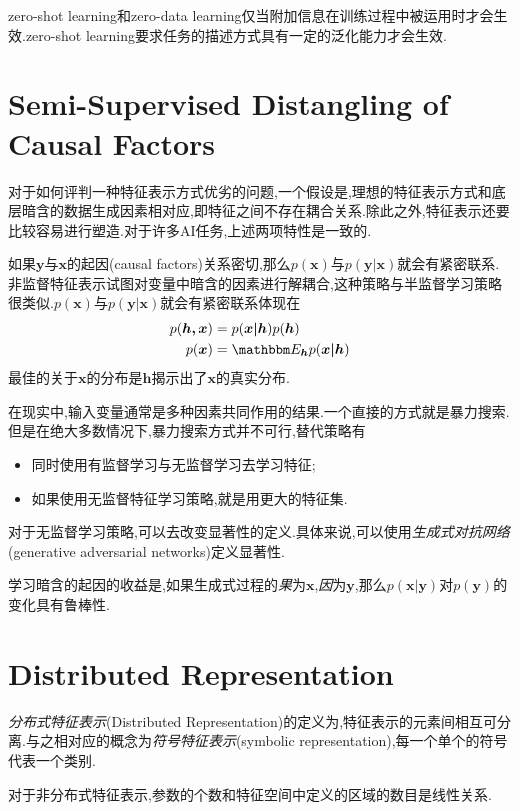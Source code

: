 zero-shot learning和zero-data learning仅当附加信息在训练过程中被运用时才会生效.zero-shot learning要求任务的描述方式具有一定的泛化能力才会生效.

\section{Semi-Supervised Distangling of Causal Factors}

对于如何评判一种特征表示方式优劣的问题,一个假设是,理想的特征表示方式和底层暗含的数据生成因素相对应,即特征之间不存在耦合关系.除此之外,特征表示还要比较容易进行塑造.对于许多AI任务,上述两项特性是一致的.

如果$\bm y$与$\bm x$的起因(causal factors)关系密切,那么$p(\bm x)$与$p(\bm{y|x})$就会有紧密联系.非监督特征表示试图对变量中暗含的因素进行解耦合,这种策略与半监督学习策略很类似.$p(\bm x)$与$p(\bm{y|x})$就会有紧密联系体现在
\begin{equation}\begin{split}
p(\bm {h,x})&=p(\bm{x|h})p(\bm h)\\
p(\bm x)&=\mathbbm E_{\bm h}p(\bm{x|h})
\end{split}\end{equation}
最佳的关于$\bm x$的分布是$\bm h$揭示出了$\bm x$的真实分布.

在现实中,输入变量通常是多种因素共同作用的结果.一个直接的方式就是暴力搜索.但是在绝大多数情况下,暴力搜索方式并不可行,替代策略有
\begin{itemize}
    \item 同时使用有监督学习与无监督学习去学习特征;
    \item 如果使用无监督特征学习策略,就是用更大的特征集.
\end{itemize}

对于无监督学习策略,可以去改变显著性的定义.具体来说,可以使用\textit{生成式对抗网络}(generative adversarial networks)定义显著性.

学习暗含的起因的收益是,如果生成式过程的\textit{果}为$\bm x$,\textit{因}为$\bm y$,那么$p(\bm{x|y})$对$p(\bm y)$的变化具有鲁棒性.

\section{Distributed Representation}

\textit{分布式特征表示}(Distributed Representation)的定义为,特征表示的元素间相互可分离.与之相对应的概念为\textit{符号特征表示}(symbolic representation),每一个单个的符号代表一个类别.

对于非分布式特征表示,参数的个数和特征空间中定义的区域的数目是线性关系.

